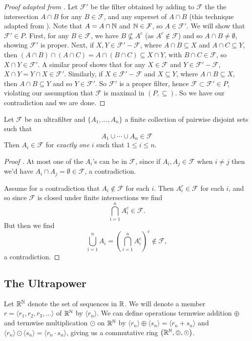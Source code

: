 \begin{proof}[Proof adapted from ]
    Let $\mathcal{F}'$ be the filter obtained by adding to $\mathcal{F}$ the the intersection $A \cap B$ for any $B \in \mathcal{F}$, and any superset of $A \cap B$ (this technique adapted from \cite[Appendix~A]{henle1979}). Note that $A = A \cap \mathbb{N}$ and $\mathbb{N} \in \mathcal{F}$, so $A \in \mathcal{F}'$. We will show that $\mathcal{F}' \in P$. First, for any $B \in \mathcal{F}$, we have $B \nsubseteq A^c$ (as $A^c \notin \mathcal{F}$) and so $A \cap B \neq \emptyset$, showing $\mathcal{F}'$ is proper. Next, if $X, Y \in \mathcal{F}' - \mathcal{F}$, where $A \cap B \subseteq X$ and $A \cap C \subseteq Y$, then $(A \cap B) \cap (A \cap C) = A \cap (B \cap C) \subseteq X \cap Y$, with $B \cap C \in \mathcal{F}$, so $X \cap Y \in \mathcal{F}'$. A similar proof shows that for any $X \in \mathcal{F}$ and $Y \in \mathcal{F}' - \mathcal{F}$, $X \cap Y = Y \cap X \in \mathcal{F}'$. Similarly, if $X \in \mathcal{F}'-\mathcal{F}$ and $X \subseteq Y$, where $A \cap B \subseteq X$, then $A \cap B \subseteq Y$ and so $Y \in \mathcal{F}'$. So $\mathcal{F}'$ is a proper filter, hence $\mathcal{F} \subset \mathcal{F}' \in P$, violating our assumption that $\mathcal{F}$ is maximal in $(P, \subseteq)$. So we have our contradiction and we are done.
\end{proof}

\begin{thm}\label{ultrafilterDisjointUnion}
    Let $\mathcal{F}$ be an ultrafilter and $\{A_1, \ldots, A_n\}$ a finite collection of pairwise disjoint sets such that 
    \[ A_1 \cup \cdots \cup A_n \in \mathcal{F} \]
    Then $A_i \in \mathcal{F}$ for \textit{exactly one} $i$ such that $1 \leq i \leq n$.
\end{thm}

\begin{proof}[Proof ]
    At most one of the $A_i$'s can be in $\mathcal{F}$, since if $A_i, A_j \in \mathcal{F}$ when $i \neq j$ then we'd have $A_i \cap A_j = \emptyset \in \mathcal{F}$, a contradiction.

    Assume for a contradiction that $A_i \notin \mathcal{F}$ for each $i$. Then $A_i^c \in \mathcal{F}$ for each $i$, and so since $\mathcal{F}$ is closed under finite intersections we find
    \[ \bigcap_{i=1}^n A_i^c \in \mathcal{F}. \]
    But then we find
    \[ \bigcup_{i=1}^n A_i  = \left(\bigcap_{i=1}^n A_i^c\right)^c \notin \mathcal{F}, \]
    a contradiction.
\end{proof}

\subsection{The Ultrapower}
Let $\mathbb{R}^{\mathbb{N}}$ denote the set of sequences in $\mathbb{R}$. We will denote a member $r = \langle r_1, r_2, r_3, \ldots \rangle$ of $\mathbb{R}^{\mathbb{N}}$ by $\langle r_n \rangle$. We can define operations termwise addition $\oplus$ and termwise multiplication $\odot$ on $\mathbb{R}^{\mathbb{N}}$ by $\langle r_n \rangle \oplus \langle s_n \rangle = \langle r_n + s_n \rangle$ and $\langle r_n \rangle \odot \langle s_n \rangle = \langle r_n \cdot s_n \rangle$, giving us a commutative ring $\left(\mathbb{R}^{\mathbb{N}}, \oplus, \odot\right)$.

